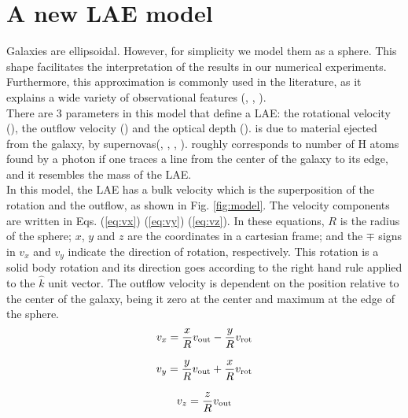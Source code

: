 \documentclass[twocolappendix]{latex/emulateapj}
\begin{document}
\section{A new LAE model}
\label{sec:newmodel}

Galaxies are ellipsoidal. However, for simplicity we model them as a sphere. This shape facilitates the interpretation of the results in our numerical experiments. Furthermore, this approximation is commonly used in the literature, as it explains a wide variety of observational features (\cite{Ahn03}, \cite{Verhamme06}, \cite{Dijkstra06}). \\

There are 3 parameters in this model that define a LAE: the rotational velocity (\vrot), the outflow velocity (\vout) and the optical depth (\tauh). \vout is due to material ejected from the galaxy, by supernovas(\cite{Verhamme06}, \cite{Orsi12}, \cite{Hashimoto2015}, \cite{Gronke2015}). \tauh roughly corresponds to number of H atoms found by a \lya photon if one traces a line from the center of the galaxy to its edge, and it resembles the mass of the LAE.\\

In this model, the LAE has a bulk velocity which is the superposition of the rotation and the outflow, as shown in Fig. \ref{fig:model}. The velocity components are written in Eqs. (\ref{eq:vx}) (\ref{eq:vy}) (\ref{eq:vz}). In these equations, $R$ is the radius of the sphere; $x$, $y$ and $z$ are the coordinates in a cartesian frame; and the $\mp$ signs in $v_x$ and $v_y$ indicate the direction of rotation, respectively. This rotation is a solid body rotation and its direction goes according to the right hand rule applied to the $\hat{k}$ unit vector. The outflow velocity is dependent on the position relative to the center of the galaxy, being it zero at the center and maximum at the edge of the sphere.\\

\begin{equation}
	v_{x}=\frac{x}{R}v_{\rm out}-\frac{y}{R}v_{\rm rot} 
	\label{eq:vx}
\end{equation}

\begin{equation}
	v_{y}=\frac{y}{R}v_{\rm out}+\frac{x}{R}v_{\rm rot} 
	\label{eq:vy}
\end{equation}

\begin{equation}
	v_{z}=\frac{z}{R}v_{\rm out}
	\label{eq:vz}
\end{equation}
\end{document}
